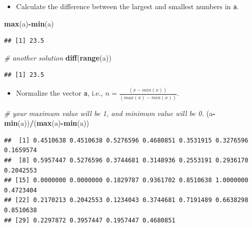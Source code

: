 \documentclass[]{book}
\newenvironment{Shaded}{\begin{snugshade}}{\end{snugshade}}
\newcommand{\CommentTok}[1]{\textcolor[rgb]{0.56,0.35,0.01}{\textit{#1}}}
\newcommand{\KeywordTok}[1]{\textcolor[rgb]{0.13,0.29,0.53}{\textbf{#1}}}
\newcommand{\NormalTok}[1]{#1}
\newcommand{\OperatorTok}[1]{\textcolor[rgb]{0.81,0.36,0.00}{\textbf{#1}}}
\providecommand{\tightlist}{%
  \setlength{\itemsep}{0pt}\setlength{\parskip}{0pt}}
\begin{document}
\begin{itemize}
\tightlist
\item
  Calculate the difference between the largest and smallest numbers in \texttt{a}.
\end{itemize}

\begin{Shaded}
\begin{Highlighting}[]
\KeywordTok{max}\NormalTok{(a)}\OperatorTok{-}\KeywordTok{min}\NormalTok{(a)}
\end{Highlighting}
\end{Shaded}

\begin{verbatim}
## [1] 23.5
\end{verbatim}

\begin{Shaded}
\begin{Highlighting}[]
\CommentTok{# another solution}
\KeywordTok{diff}\NormalTok{(}\KeywordTok{range}\NormalTok{(a))}
\end{Highlighting}
\end{Shaded}

\begin{verbatim}
## [1] 23.5
\end{verbatim}

\begin{itemize}
\tightlist
\item
  Normalize the vector \texttt{a}, i.e., \(n = \frac{(x-min(x))}{(max(x)-min(x))}\).
\end{itemize}

\begin{Shaded}
\begin{Highlighting}[]
\CommentTok{# your maximum value will be 1, and minimum value will be 0. }
\NormalTok{(a}\OperatorTok{-}\KeywordTok{min}\NormalTok{(a))}\OperatorTok{/}\NormalTok{(}\KeywordTok{max}\NormalTok{(a)}\OperatorTok{-}\KeywordTok{min}\NormalTok{(a))}
\end{Highlighting}
\end{Shaded}

\begin{verbatim}
##  [1] 0.4510638 0.4510638 0.5276596 0.4680851 0.3531915 0.3276596 0.1659574
##  [8] 0.5957447 0.5276596 0.3744681 0.3148936 0.2553191 0.2936170 0.2042553
## [15] 0.0000000 0.0000000 0.1829787 0.9361702 0.8510638 1.0000000 0.4723404
## [22] 0.2170213 0.2042553 0.1234043 0.3744681 0.7191489 0.6638298 0.8510638
## [29] 0.2297872 0.3957447 0.1957447 0.4680851
\end{verbatim}
\end{document}
